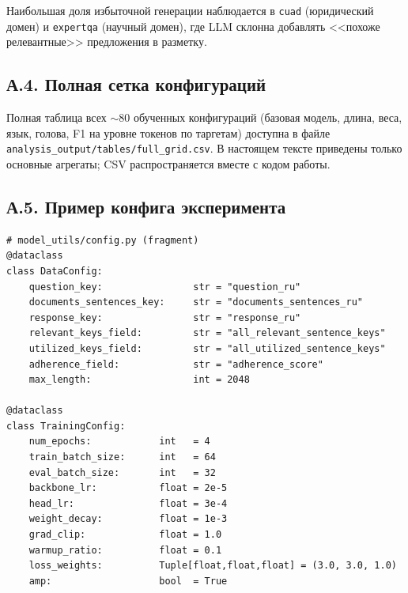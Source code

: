 Наибольшая доля избыточной генерации наблюдается в \texttt{cuad} (юридический домен)
и \texttt{expertqa} (научный домен), где LLM склонна добавлять
<<похоже релевантные>> предложения в разметку.

\subsection*{А.4. Полная сетка конфигураций}

Полная таблица всех $\sim$80 обученных конфигураций 
(базовая модель, длина, веса, язык, голова, F1 на уровне токенов по таргетам) 
доступна в файле \texttt{analysis\_output/tables/full\_grid.csv}. 
В настоящем тексте приведены только основные агрегаты; CSV распространяется вместе 
с кодом работы.

\subsection*{А.5. Пример конфига эксперимента}

\begin{lstlisting}[basicstyle=\ttfamily\scriptsize,breaklines=true]
# model_utils/config.py (fragment)
@dataclass
class DataConfig:
    question_key:                str = "question_ru"
    documents_sentences_key:     str = "documents_sentences_ru"
    response_key:                str = "response_ru"
    relevant_keys_field:         str = "all_relevant_sentence_keys"
    utilized_keys_field:         str = "all_utilized_sentence_keys"
    adherence_field:             str = "adherence_score"
    max_length:                  int = 2048

@dataclass
class TrainingConfig:
    num_epochs:            int   = 4
    train_batch_size:      int   = 64
    eval_batch_size:       int   = 32
    backbone_lr:           float = 2e-5
    head_lr:               float = 3e-4
    weight_decay:          float = 1e-3
    grad_clip:             float = 1.0
    warmup_ratio:          float = 0.1
    loss_weights:          Tuple[float,float,float] = (3.0, 3.0, 1.0)
    amp:                   bool  = True
\end{lstlisting}
